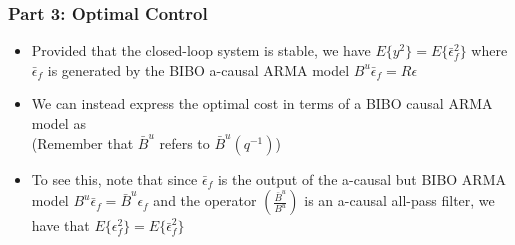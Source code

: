 \begin{frame}
    \frametitle{Part 3: Optimal Control}

    \begin{itemize}
        \item
        Provided that the closed-loop system is stable, we have $E \{ y^2 \} = E \{ \bar{\epsilon}_f^2 \}$ where $\bar{\epsilon}_f$ is generated by the BIBO a-causal ARMA model $B^u \bar{\epsilon}_f = R \epsilon$
        \pause

        \item
        We can instead express the optimal cost in terms of a BIBO causal ARMA model as
        \paused
        \\
        (Remember that $\bar{B}^u$ refers to $\bar{B}^u(q^{-1})$)

        \item
        To see this, note that since $\bar{\epsilon}_f$ is the output of the a-causal but BIBO ARMA model $B^u \bar{\epsilon}_f = \bar{B}^u \epsilon_f$ and the operator $\displaystyle{ \left(\frac{\bar{B}^u}{B^u}\right) }$ is an a-causal all-pass filter, we have that $E\{\epsilon_f^2 \} = E\{\bar{\epsilon}_f^2\}$

    \end{itemize}

\end{frame}

